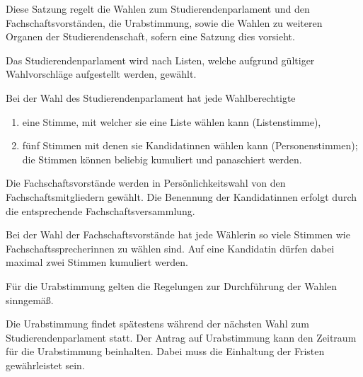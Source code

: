 

\begin{jurdoc}

\label{wahl:geltungsbereich}
Diese Satzung regelt die Wahlen zum Studierendenparlament und den Fachschaftsvorständen, die Urabstimmung, sowie die Wahlen zu weiteren Organen der Studierendenschaft, sofern eine Satzung dies vorsieht.

\label{wahl:wahlsystem}
Das Studierendenparlament wird nach Listen, welche aufgrund gültiger Wahlvorschläge aufgestellt werden, gewählt. 

Bei der Wahl des Studierendenparlament hat jede Wahlberechtigte
\begin{enumerate}
    \item eine Stimme, mit welcher sie eine Liste wählen kann (Listenstimme),
    \item fünf Stimmen mit denen sie Kandidatinnen wählen kann (Personenstimmen); die Stimmen können beliebig kumuliert und panaschiert werden.
\end{enumerate}

Die Fachschaftsvorstände werden in Persönlichkeitswahl von den Fachschaftsmitgliedern gewählt. Die Benennung der Kandidatinnen erfolgt durch die entsprechende Fachschaftsversammlung.

Bei der Wahl der Fachschaftsvorstände hat jede Wählerin so viele Stimmen wie Fachschaftssprecherinnen zu wählen sind. Auf eine Kandidatin dürfen dabei maximal zwei Stimmen kumuliert werden.

\label{wahl:urabstimmung}
Für die Urabstimmung gelten die Regelungen zur Durchführung der Wahlen sinngemäß. 

Die Urabstimmung findet spätestens während der nächsten Wahl zum Studierendenparlament statt. Der Antrag auf Urabstimmung kann den Zeitraum für die Urabstimmung beinhalten. Dabei muss die Einhaltung der Fristen gewährleistet sein.

\label{wahl:wahlberechtigung}


\end{jurdoc}
